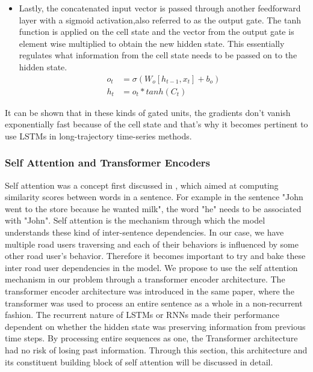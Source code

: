 \documentclass{article}
\begin{document}
\begin{itemize}
\begin{equation}
    \end{equation}
    \item Lastly, the concatenated input vector is passed through another feedforward layer with a sigmoid activation,also referred to as the output gate. The tanh function is applied on the cell state and the vector from the output gate is element wise multiplied to obtain the new hidden state. This essentially regulates what information from the cell state needs to be passed on to the hidden state.
    \begin{equation}
        \begin{split}
            o_t&=\sigma(W_o[h_{t-1},x_t]+b_o)\\
            h_t&=o_t*tanh(C_t)
        \end{split}
    \end{equation}
    
\end{itemize}

It can be shown that in these kinds of gated units, the gradients don't vanish exponentially fast because of the cell state and that's why it becomes pertinent to use LSTMs in long-trajectory time-series methods. 

\subsubsection{Self Attention and Transformer Encoders}
Self attention was a concept first discussed in \cite{vaswani_attention_2017} , which aimed at computing similarity scores between words in a sentence. For example in the sentence "John went to the store because he wanted milk", the word "he" needs to be associated with "John". Self attention is the mechanism through which the model understands these kind of inter-sentence dependencies. In our case, we have multiple road users traversing and each of their behaviors is influenced by some other road user's behavior. Therefore it becomes important to try and bake these inter road user dependencies in the model.  We propose to use the self attention mechanism in our problem through a transformer encoder architecture. The transformer encoder architecture was introduced in the same paper, where the transformer was used to process an entire sentence as a whole in a non-recurrent fashion. The recurrent nature of LSTMs or RNNs made their performance dependent on whether the hidden state was preserving information from previous time steps. By processing entire sequences as one, the Transformer architecture had no risk of losing past information. Through this section, this architecture and its constituent building block of self attention will be discussed in detail. 
\end{document}
